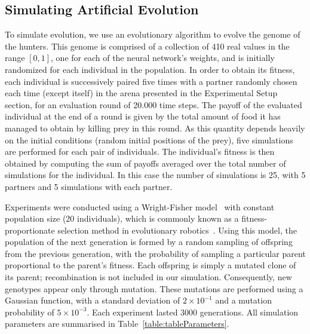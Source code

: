   \subsection{Simulating Artificial Evolution} 
  \label{artificialEvolution}
    To simulate evolution, we use an evolutionary algorithm to evolve the genome of the hunters. This genome is comprised of a collection of 410 real values in the range \([0,1]\), one for each of the neural network's weights, and is initially randomized for each individual in the population. In order to obtain its fitness, each individual is successively paired five times with a partner randomly chosen each time (except itself) in the arena presented in the Experimental Setup section, for an evaluation round of 20.000 time steps. The payoff of the evaluated individual at the end of a round is given by the total amount of food it has managed to obtain by killing prey in this round. As this quantity depends heavily on the initial conditions (random initial positions of the prey), five simulations are performed for each pair of individuals. The individual's fitness is then obtained by computing the sum of payoffs averaged over the total number of simulations for the individual. In this case the number of simulations is 25, with 5 partners and 5 simulations with each partner.

    Experiments were conducted using a Wright-Fisher model~\parencite{Wright1931} with constant population size (20 individuals), which is commonly known as a fitness-proportionate selection method in evolutionary robotics~\parencite{Eiben2003}. Using this model, the population of the next generation is formed by a random sampling of offspring from the previous generation, with the probability of sampling a particular parent proportional to the parent's fitness. Each offspring is simply a mutated clone of its parent; recombination is not included in our simulation. Consequently, new genotypes appear only through mutation. These mutations are performed using a Gaussian function, with a standard deviation of \(2 \times 10^{-1}\) and a mutation probability of \(5 \times 10^{-3}\). Each experiment lasted 3000 generations. All simulation parameters are summarised in Table~\ref{table:tableParameters}.

